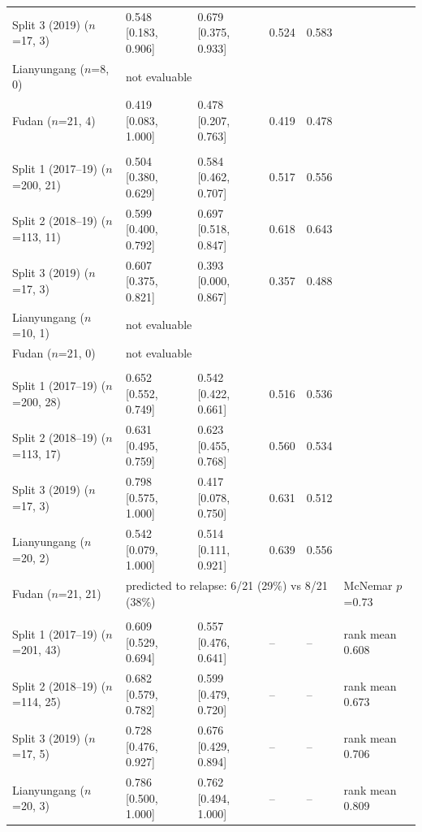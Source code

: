 \documentclass[pdflatex,sn-nature]{sn-jnl}
\begin{document}
\begin{appendices}
\begin{table}
\begin{tabular}{@{}lllll>{\raggedright\arraybackslash}p{4.7cm}@{}}
\quad Split 3 (2019) ($n$=17, 3) & 0.548 [0.183, 0.906] & 0.679 [0.375, 0.933] & 0.524 & 0.583 & \\
\quad Lianyungang ($n$=8, 0) & \multicolumn{5}{l}{not evaluable} \\
\quad Fudan ($n$=21, 4) & 0.419 [0.083, 1.000] & 0.478 [0.207, 0.763] & 0.419 & 0.478 & \\
\addlinespace[2pt]
\multicolumn{6}{@{}l}{\textit{D46 MRD ($\mathcal{F}_6$)}} \\
\quad Split 1 (2017--19) ($n$=200, 21) & 0.504 [0.380, 0.629] & 0.584 [0.462, 0.707] & 0.517 & 0.556 & \\
\quad Split 2 (2018--19) ($n$=113, 11) & 0.599 [0.400, 0.792] & 0.697 [0.518, 0.847] & 0.618 & 0.643 & \\
\quad Split 3 (2019) ($n$=17, 3) & 0.607 [0.375, 0.821] & 0.393 [0.000, 0.867] & 0.357 & 0.488 & \\
\quad Lianyungang ($n$=10, 1) & \multicolumn{5}{l}{not evaluable} \\
\quad Fudan ($n$=21, 0) & \multicolumn{5}{l}{not evaluable} \\
\addlinespace[2pt]
\multicolumn{6}{@{}l}{\textit{Relapse ($\mathcal{F}_6$)}} \\
\quad Split 1 (2017--19) ($n$=200, 28) & 0.652 [0.552, 0.749] & 0.542 [0.422, 0.661] & 0.516 & 0.536 & \\
\quad Split 2 (2018--19) ($n$=113, 17) & 0.631 [0.495, 0.759] & 0.623 [0.455, 0.768] & 0.560 & 0.534 & \\
\quad Split 3 (2019) ($n$=17, 3) & 0.798 [0.575, 1.000] & 0.417 [0.078, 0.750] & 0.631 & 0.512 & \\
\quad Lianyungang ($n$=20, 2) & 0.542 [0.079, 1.000] & 0.514 [0.111, 0.921] & 0.639 & 0.556 & \\
\quad Fudan ($n$=21, 21) & \multicolumn{4}{l}{predicted to relapse: 6/21 (29\%) vs 8/21 (38\%)} & McNemar $p$=0.73 \\
\addlinespace[2pt]
\multicolumn{6}{@{}l}{\textit{EFS ($\mathcal{F}_6$)}} \\
\quad Split 1 (2017--19) ($n$=201, 43) & 0.609 [0.529, 0.694] & 0.557 [0.476, 0.641] & -- & -- & rank mean 0.608 \\
\quad Split 2 (2018--19) ($n$=114, 25) & 0.682 [0.579, 0.782] & 0.599 [0.479, 0.720] & -- & -- & rank mean 0.673 \\
\quad Split 3 (2019) ($n$=17, 5) & 0.728 [0.476, 0.927] & 0.676 [0.429, 0.894] & -- & -- & rank mean 0.706 \\
\quad Lianyungang ($n$=20, 3) & 0.786 [0.500, 1.000] & 0.762 [0.494, 1.000] & -- & -- & rank mean 0.809 \\

\end{tabular}
\end{table}
\end{appendices}
\end{document}
